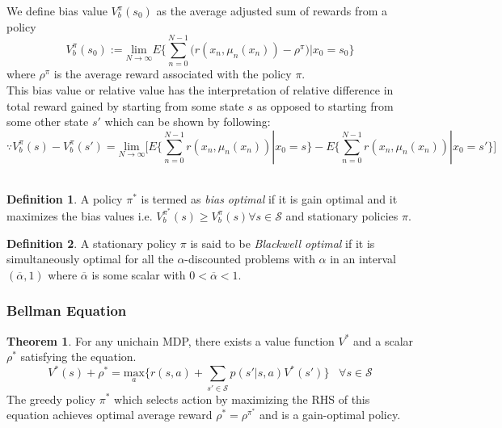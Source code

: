\documentclass{article}
\theoremstyle{definition}
\newtheorem{definition}{Definition}[section]
\newtheorem{theorem}{Theorem}[section]
\begin{document}
We define bias value  $V_b^\pi(s_0)$ as the average adjusted sum of rewards from a policy
\begin{equation}
    V_b^\pi(s_0) := \underset{N\rightarrow\infty}{\text{lim}} E\Big\{\sum_{n=0}^{N-1}\Big(r(x_n,\mu_n(x_n))-\rho^\pi\Big)|x_0=s_0\Big\}
\end{equation}
where $\rho^\pi$ is the average reward associated with the policy $\pi$.\\
This bias value or relative value has the interpretation of relative difference in total reward gained by starting from some state $s$ as opposed to starting from some other state $s'$ which can be shown by following:
\[\because V_b^\pi(s)-V_b^\pi(s') = \underset{N\rightarrow\infty}{\text{lim}}\Bigg[E\Big\{\sum_{n=0}^{N-1}r(x_n,\mu_n(x_n))|x_0=s\Big\} -  E\Big\{\sum_{n=0}^{N-1}r(x_n,\mu_n(x_n))|x_0=s'\Big\}\Bigg]\]\\

\begin{definition}
A policy $\pi^*$ is termed as \textit{bias optimal} if it is gain optimal and it maximizes the bias values i.e. $V_b^{\pi^*}(s)\geq V_b^{\pi}(s) \forall s \in \mathcal{S}$ and stationary policies $\pi$.
\end{definition}

\begin{definition}
\label{def:blackwell}
A stationary policy $\pi$ is said to be \textit{Blackwell optimal} if it is simultaneously optimal for all the $\alpha$-discounted problems with $\alpha$ in an interval $(\overline{\alpha},1)$ where $\overline{\alpha}$ is some scalar with $0<\overline{\alpha}<1$.
\end{definition}



\subsubsection{Bellman Equation}
\begin{theorem}
For any unichain MDP, there exists a value function $V^*$ and a scalar $\rho^*$ satisfying the equation.
\begin{equation}
    \label{eqn:bellman}
    V^*(s)+\rho^* = \underset{a}{\text{max}}\Big\{r(s,a)+ \sum_{s'\in\mathcal{S}}p(s'|s,a)V^*(s')\Big\}  \hspace{10pt} \forall s \in \mathcal{S}
\end{equation}
The greedy policy $\pi^*$ which selects action by maximizing the RHS of this equation achieves optimal average reward $\rho^* = \rho^{\pi^*}$ and is a gain-optimal policy.
\end{theorem}
\end{document}
